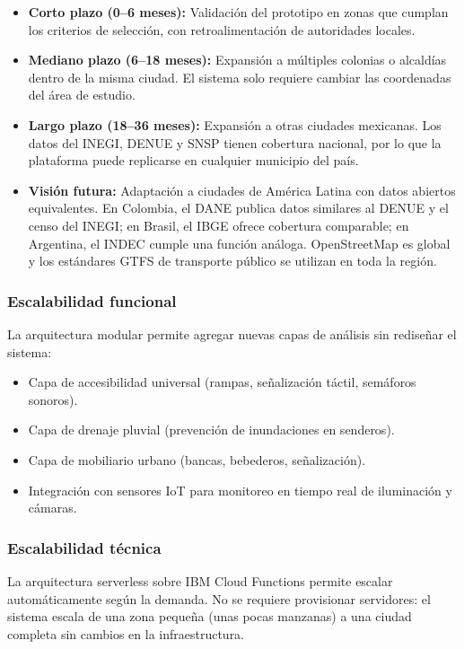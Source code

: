 \documentclass[12pt,a4paper]{article}
\begin{document}
\begin{itemize}[leftmargin=1.5cm]
    \item \textbf{Corto plazo (0--6 meses):} Validación del prototipo en zonas que cumplan los criterios de selección, con retroalimentación de autoridades locales.
    \item \textbf{Mediano plazo (6--18 meses):} Expansión a múltiples colonias o alcaldías dentro de la misma ciudad. El sistema solo requiere cambiar las coordenadas del área de estudio.
    \item \textbf{Largo plazo (18--36 meses):} Expansión a otras ciudades mexicanas. Los datos del INEGI, DENUE y SNSP tienen cobertura nacional, por lo que la plataforma puede replicarse en cualquier municipio del país.
    \item \textbf{Visión futura:} Adaptación a ciudades de América Latina con datos abiertos equivalentes. En Colombia, el DANE publica datos similares al DENUE y el censo del INEGI; en Brasil, el IBGE ofrece cobertura comparable; en Argentina, el INDEC cumple una función análoga. OpenStreetMap es global y los estándares GTFS de transporte público se utilizan en toda la región.
\end{itemize}

\subsubsection{Escalabilidad funcional}

La arquitectura modular permite agregar nuevas capas de análisis sin rediseñar el sistema:

\begin{itemize}[leftmargin=1.5cm]
    \item Capa de accesibilidad universal (rampas, señalización táctil, semáforos sonoros).
    \item Capa de drenaje pluvial (prevención de inundaciones en senderos).
    \item Capa de mobiliario urbano (bancas, bebederos, señalización).
    \item Integración con sensores IoT para monitoreo en tiempo real de iluminación y cámaras.
\end{itemize}

\subsubsection{Escalabilidad técnica}

La arquitectura serverless sobre IBM Cloud Functions permite escalar automáticamente según la demanda. No se requiere provisionar servidores: el sistema escala de una zona pequeña (unas pocas manzanas) a una ciudad completa sin cambios en la infraestructura.
\end{document}
